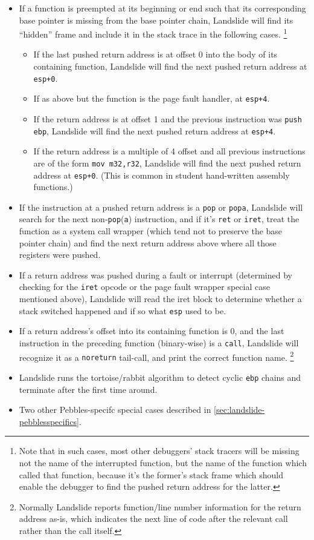 \begin{itemize}
	\item If a function is preempted at its beginning or end
		such that its corresponding base pointer is missing from the base pointer chain,
		Landslide will find its ``hidden'' frame and include it in the stack trace in the following cases.%
		\footnote{Note that in such cases,
		most other debuggers' stack tracers will be missing not the name of the interrupted function,
		but the name of the function which called that function,
		because it's the former's stack frame which should enable the debugger
		to find the pushed return address for the latter.}
		\begin{itemize}
			\item If the last pushed return address is at offset 0 into the body of its containing function,
				Landslide will find the next pushed return address at {\tt esp+0}.
			\item If as above but the function is the page fault handler, at {\tt esp+4}.
			\item If the return address is at offset 1 and the previous instruction was {\tt push ebp},
				Landslide will find the next pushed return address at {\tt esp+4}.
			\item If the return address is a multiple of 4 offset
				and all previous instructions are of the form {\tt mov m32,r32},
				Landslide will find the next pushed return address at {\tt esp+0}.
				(This is common in student hand-written assembly functions.)
		\end{itemize}
	\item If the instruction at a pushed return address is a {\tt pop} or {\tt popa},
		Landslide will search for the next non-{\tt pop}({\tt a}) instruction,
		and if it's {\tt ret} or {\tt iret},
		treat the function as a system call wrapper
		(which tend not to preserve the base pointer chain)
		and find the next return address above where all those registers were pushed.
	\item If a return address was pushed during a fault or interrupt
		(determined by checking for the {\tt iret} opcode or the page fault wrapper special case mentioned above),
		Landslide will read the iret block to determine whether a stack switched happened
		and if so what {\tt esp} used to be.
	\item If a return address's offset into its containing function is 0,
		and the last instruction in the preceding function (binary-wise) is a {\tt call},
		Landslide will recognize it as a {\tt noreturn} tail-call, and print the correct function name.%
		\footnote{Normally Landslide reports function/line number information for the return address as-is,
		which indicates the next line of code after the relevant call rather than the call itself.}
	\item Landslide runs the tortoise/rabbit algorithm to detect cyclic {\tt ebp} chains and terminate after the first time around.
	\item Two other Pebbles-specifc special cases described in \cref{sec:landslide-pebblesspecifics}.
\end{itemize}

